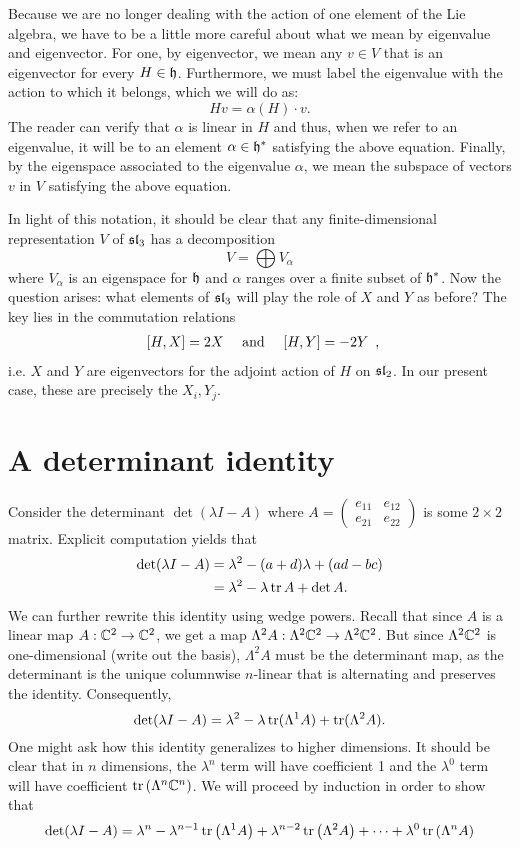 \documentclass{../mathnotes}
\begin{document}
Because we are no longer dealing with the action of one element of the Lie algebra, we have to be a little more
careful about what we mean by eigenvalue and eigenvector. For one, by eigenvector, we mean any $v\in V$ that is an eigenvector
for every $H\in\mathfrak h$. Furthermore, we must label the eigenvalue with the action to which it belongs, which we will do as:
\[Hv=\alpha(H)\cdot v.\]
The reader can verify that $\alpha$ is linear in $H$ and thus, when we refer to an eigenvalue, it will be to an element $\alpha\in\mathfrak h^*$
satisfying the above equation. Finally, by the eigenspace associated to the eigenvalue $\alpha$, we mean the subspace of
vectors $v$ in $V$ satisfying the above equation.

In light of this notation, it should be clear that any finite-dimensional representation $V$ of $\mathfrak{sl}_3$ has a decomposition
\[V=\bigoplus V_\alpha\]
where $V_\alpha$ is an eigenspace for $\mathfrak h$ and $\alpha$ ranges over a finite subset of $\mathfrak h^*$. Now the question arises:
what elements of $\mathfrak{sl}_3$ will play the role of $X$ and $Y$ as before? The key lies in the commutation relations
\[
    \begin{array}[]{ccc}
        [H,X]=2X & \text{ and } & [H,Y]=-2Y 
    \end{array},
\]
i.e. $X$ and $Y$ are eigenvectors for the adjoint action of $H$ on $\mathfrak{sl}_2$. In our present case, these are precisely
the $X_i,Y_j$.




\section{A determinant identity}

Consider the determinant $\det\left( \lambda I-A \right)$ where $A=\left(\begin{smallmatrix}e_{11} & e_{12}\\e_{21}&e_{22}\end{smallmatrix}\right)$
is some $2\times 2$ matrix. Explicit computation yields that
\begin{align*}
    \det(\lambda I-A)&=\lambda^2-(a+d)\lambda+(ad-bc)\\
    &=\lambda^2-\lambda\operatorname{tr} A + \det A.
\end{align*}
We can further rewrite this identity using wedge powers. Recall that since $A$ is a linear map $A:\mathbb{C}^2\to\mathbb{C}^2$, we get
a map $\Lambda^2 A:\Lambda^2\mathbb{C}^2\to\Lambda^2\mathbb{C}^2$. But since $\Lambda^2\mathbb{C}^2$ is one-dimensional (write out the basis),
$\Lambda^2 A$ must be the determinant map, as the determinant is the unique columnwise $n$-linear that is alternating and
preserves the identity. Consequently,
\[ \det(\lambda I-A)=\lambda^2-\lambda\operatorname{tr}(\Lambda^1A)+\operatorname{tr}(\Lambda^2A). \]
One might ask how this identity generalizes to higher dimensions. It should be clear that in $n$ dimensions, the $\lambda^n$ term
will have coefficient 1 and the $\lambda^0$ term will have coefficient $\operatorname{tr}\left(\Lambda^n\mathbb{C}^n\right)$. We will proceed by induction
in order to show that
\[\det(\lambda I-A)=\lambda^n-\lambda^{n-1}\operatorname{tr}\left( \Lambda^1A \right)+\lambda^{n-2}\operatorname{tr}\left( \Lambda^2A \right)+\cdots+\lambda^0\operatorname{tr}\left(\Lambda^nA\right)\]
\end{document}
